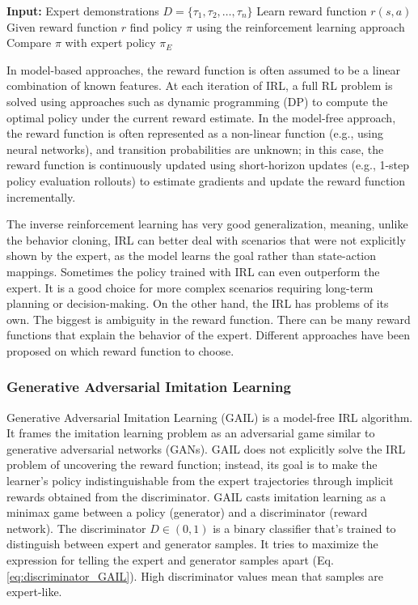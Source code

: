 \begin{algorithm}
\caption{Inverse Reinforcement Learning (IRL)}
\begin{algorithmic}[1]
\State \textbf{Input:} Expert demonstrations $D = \{\tau_1, \tau_2,\dots, \tau_n\}$
\Repeat
\State Learn reward function $r(s, a)$
\State Given reward function $r$ find policy $\pi$ using the reinforcement learning approach
\State Compare $\pi$ with expert policy $\pi_E$
\end{algorithmic}
\end{algorithm}

\noindent
In model-based approaches, the reward function is often assumed to be a linear combination of known features. At each iteration of IRL, a full RL problem is solved using approaches such as dynamic programming (DP) to compute the optimal policy under the current reward estimate. In the model-free approach, the reward function is often represented as a non-linear function (e.g., using neural networks), and transition probabilities are unknown; in this case, the reward function is continuously updated using short-horizon updates (e.g., 1-step policy evaluation rollouts) to estimate gradients and update the reward function incrementally.

\bigskip \noindent
The inverse reinforcement learning has very good generalization, meaning, unlike the behavior cloning, IRL can better deal with scenarios that were not explicitly shown by the expert, as the model learns the goal rather than state-action mappings. Sometimes the policy trained with IRL can even outperform the expert. It is a good choice for more complex scenarios requiring long-term planning or decision-making. On the other hand, the IRL has problems of its own. The biggest is ambiguity in the reward function. There can be many reward functions that explain the behavior of the expert. Different approaches have been proposed on which reward function to choose.

\subsubsection{Generative Adversarial Imitation Learning}
Generative Adversarial Imitation Learning (GAIL) \cite{ho2016generativeadversarialimitationlearning} is a model-free IRL algorithm. It frames the imitation learning problem as an adversarial game similar to generative adversarial networks (GANs). GAIL does not explicitly solve the IRL problem of uncovering the reward function; instead, its goal is to make the learner's policy indistinguishable from the expert trajectories through implicit rewards obtained from the discriminator. GAIL casts imitation learning as a minimax game between a policy (generator) and a discriminator (reward network). The discriminator $D\in(0,1)$ is a binary classifier that's trained to distinguish between expert and generator samples. It tries to maximize the expression for telling the expert and generator samples apart (Eq. \ref{eq:discriminator_GAIL}). High discriminator values mean that samples are expert-like.

